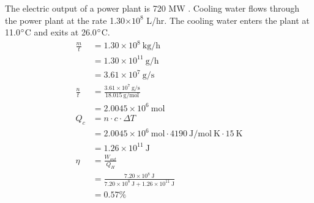 \documentclass[12pt]{article}
\newcommand{\units}[1]{\mathrm{~#1}}
\begin{document}
    The electric output of a power plant is 720 MW . Cooling water flows through the power plant at the rate 1.30\(\times\)\(10^8\) L/hr. The cooling water enters the plant at 11.0\(\degree\)C and exits at 26.0\(\degree\)C.
    \begin{align*}
        \frac{m}{t} &= 1.30\times 10^8 \units{kg/h}\\
        &=1.30 \times 10^{11} \units{g/h}\\
        &=3.61 \times 10^7 \units{g/s}\\
        \frac{n}{t} &= \frac{3.61 \times 10^7 \units{g/s}}{18.015 \units{g/mol}}\\
        &= 2.0045 \times 10^6 \units{mol}\\
        Q_c&=n \cdot c \cdot \Delta T\\
        &= 2.0045 \times 10^6 \units{mol} \cdot 4190 \units{J/mol~K} \cdot 15 \units{K}\\
        &= 1.26 \times 10^11 \units{J}\\
        \eta &= \frac{W_{out}}{Q_H}\\
        & = \frac{7.20\times 10^8 \units{J}}{7.20\times 10^8 \units{J} + 1.26 \times 10^{11} \units{J}}\\
        &=0.57\%
    \end{align*}        
\end{document}
